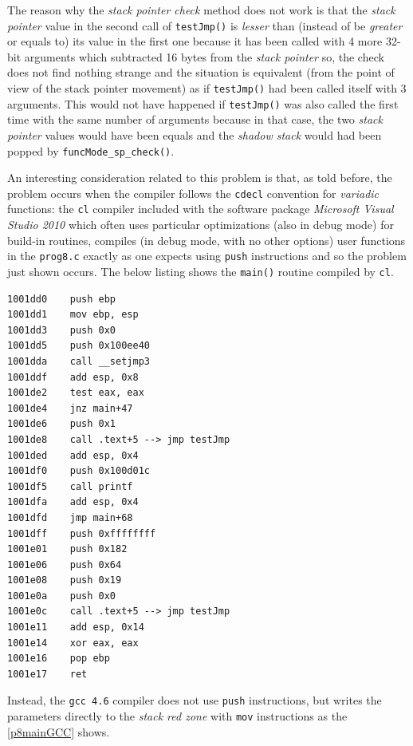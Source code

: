 \documentclass[a4paper,10pt]{report}
\begin{document}
The reason why the \emph{stack pointer check} method does not work is that
the \emph{stack pointer} value in the second call of \verb|testJmp()| is \emph{lesser}
than (instead of be \emph{greater} or equals to) 
its value in the first one because it has been called with 4 more 32-bit arguments 
which subtracted 16 bytes from the \emph{stack pointer} so, the check does not 
find nothing strange and the situation is equivalent (from the point of view of the stack pointer movement) as if \verb|testJmp()| had been called itself with 3 arguments.
This would not have happened if \verb|testJmp()| was also called the first time with 
the same number of arguments because in that case, the two \emph{stack pointer} values
would have been equals and the \emph{shadow stack} would had been popped 
by \verb|funcMode_sp_check()|.

An interesting consideration related to this problem is that, as told before,
the problem occurs when the compiler follows the \verb|cdecl| 
convention for \emph{variadic} functions:
the \verb|cl| compiler included with the software package 
\emph{Microsoft Visual Studio 2010} which often uses particular optimizations (also in debug mode) for build-in routines, compiles (in debug mode, with no other options) 
user functions in the \verb|prog8.c| exactly as one expects using \verb|push| instructions
and so the problem just shown occurs. The below listing shows the \verb|main()| routine
compiled by \verb|cl|.

\begin{lstlisting}[language={[x86masm]Assembler}, 
	label=p8mainCL, caption={\texttt{main()} disassembly of \texttt{prog8.c} compiled with \texttt{cl}}, frame=leftline]
1001dd0    push ebp
1001dd1    mov ebp, esp
1001dd3    push 0x0
1001dd5    push 0x100ee40
1001dda    call __setjmp3
1001ddf    add esp, 0x8
1001de2    test eax, eax
1001de4    jnz main+47
1001de6    push 0x1
1001de8    call .text+5 --> jmp testJmp
1001ded    add esp, 0x4
1001df0    push 0x100d01c
1001df5    call printf
1001dfa    add esp, 0x4
1001dfd    jmp main+68
1001dff    push 0xffffffff
1001e01    push 0x182
1001e06    push 0x64
1001e08    push 0x19
1001e0a    push 0x0
1001e0c    call .text+5 --> jmp testJmp
1001e11    add esp, 0x14
1001e14    xor eax, eax
1001e16    pop ebp
1001e17    ret 
\end{lstlisting}

\noindent
Instead, the \verb|gcc 4.6| compiler does not use \verb|push| instructions, but
writes the parameters directly to the \emph{stack red zone} 
with \verb|mov| instructions as the \cref{p8mainGCC} shows.
\end{document}
